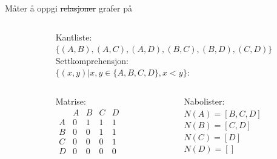 \begin{frame}[fragile]{Måter å oppgi \sout{relasjoner} grafer på}
    \begin{columns}
        \begin{column}{0.3\textwidth}
        \end{column}
        \begin{column}{0.65\textwidth}
            \pause
            Kantliste:\\
            $\{(A, B), (A, C), (A, D), (B, C), (B, D), (C, D)\}$\\[5mm]
            \pause
            Settkomprehensjon:\\
            $\{(x, y) | x, y \in \{A,B,C,D\}, x < y\}$:\\[5mm]
            \pause
            \begin{columns}
                \begin{column}{0.27\textwidth}
                    Matrise:\\
                    \begin{math}
                        \begin{matrix}
                              & A & B & C & D\\
                            A & 0 & 1 & 1 & 1\\
                            B & 0 & 0 & 1 & 1\\
                            C & 0 & 0 & 0 & 1\\
                            D & 0 & 0 & 0 & 0
                        \end{matrix}
                    \end{math}
                \end{column}
                \pause
                \begin{column}{0.38\textwidth}
                    Nabolister:\\        
                    $N(A) = [B, C, D]$\\
                    $N(B) = [C, D]$\\
                    $N(C) = [D]$\\
                    $N(D) = []$
                \end{column} 
            \end{columns}
        \end{column}
    \end{columns}
\end{frame}

